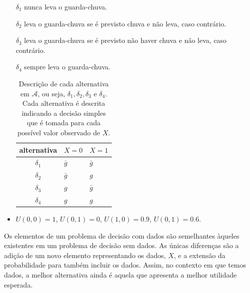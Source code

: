\begin{example}
\begin{itemize}
  $\delta_{1}$ nunca leva o guarda-chuva.
										
  $\delta_{2}$ leva o guarda-chuva se 
  é previsto chuva e não leva, caso contrário.
  
  $\delta_{3}$ leva o guarda-chuva se é previsto
  não haver chuva e não leva, caso contrário.
  
  $\delta_{4}$ sempre leva o guarda-chuva.
  \begin{table}
   \centering
   \begin{tabular}{|c|l|l|}
    \hline
    alternativa & $X=0$ & $X=1$ \\
	\hline
	$\delta_{1}$ & $\bar{g}$ & $\bar{g}$ \\
	$\delta_{2}$ & $\bar{g}$ & $g$ \\
	$\delta_{3}$ & $g$ & $\bar{g}$ \\
	$\delta_{4}$ & $g$ & $g$ \\
	\hline
   \end{tabular}
   \caption{Descrição de cada alternativa em
   $\mathcal{A}$, ou seja,
   $\delta_{1}, \delta_{2}, \delta_{3}$ e 
   $\delta_{4}$. Cada alternativa é 
   descrita indicando a decisão simples que
   é tomada para cada possível valor 
   observado de $X$.}
   \label{ex:chuva-dados}
  \end{table}
  \item $U(0,0) = 1$, 
  $U(0,1) = 0$, $U(1,0) = 0.9$, $U(0,1) = 0.6$.	 
 \end{itemize}
\end{example}

Os elementos de um problema de decisão com dados
são semelhantes àqueles existentes em um problema de decisão sem dados.
As únicas diferenças são a adição de um novo elemento
representando os dados, $X$, e 
a extensão da probabilidade para também incluir os dados.
Assim, no contexto em que temos dados,
a melhor alternativa ainda é aquela que
apresenta a melhor utilidade esperada.

